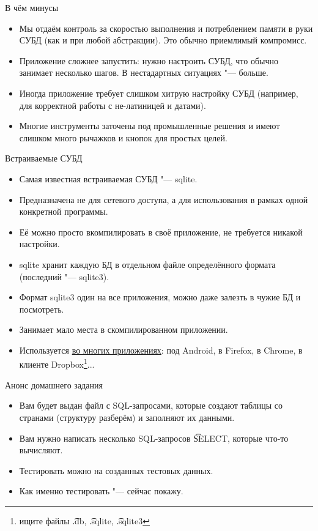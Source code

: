 \begin{frame}{В чём минусы}
	\begin{itemize}
		\item
			Мы отдаём контроль за скоростью выполнения и потреблением памяти в руки СУБД
			(как и при любой абстракции).
			Это обычно приемлимый компромисс.
		\item
			Приложение сложнее запустить: нужно настроить СУБД, что обычно занимает несколько шагов.
			В нестадартных ситуациях "--- больше.
		\item
			Иногда приложение требует слишком хитрую настройку СУБД (например, для корректной работы
			с не-латиницей и датами).
		\item
			Многие инструменты заточены под промышленные решения и имеют слишком много рычажков и кнопок
			для простых целей.
	\end{itemize}
\end{frame}

\begin{frame}{Встраиваемые СУБД}
	\begin{itemize}
		\item Самая известная встраиваемая СУБД "--- sqlite.
		\item Предназначена не для сетевого доступа, а для использования в рамках одной конкретной программы.
		\item Её можно просто вкомпилировать в своё приложение, не требуется никакой настройки.
		\item sqlite хранит каждую БД в отдельном файле определённого формата (последний "--- sqlite3).
		\item Формат sqlite3 один на все приложения, можно даже залезть в чужие БД и посмотреть.
		\item Занимает мало места в скомпилированном приложении.
		\item
			Используется \href{http://www.sqlite.org/famous.html}{во многих приложениях}:
			под Android, в Firefox, в Chrome, в клиенте Dropbox\footnote{ищите файлы \t{.db}, \t{.sqlite}, \t{.sqlite3}}...
	\end{itemize}
\end{frame}

\begin{frame}{Анонс домашнего задания}
	\begin{itemize}
		\item Вам будет выдан файл с SQL-запросами, которые создают таблицы со странами (структуру разберём) и заполняют их данными.
		\item Вам нужно написать несколько SQL-запросов \t{SELECT}, которые что-то вычисляют.
		\item Тестировать можно на созданных тестовых данных.
		\item Как именно тестировать "--- сейчас покажу.
	\end{itemize}
\end{frame}

